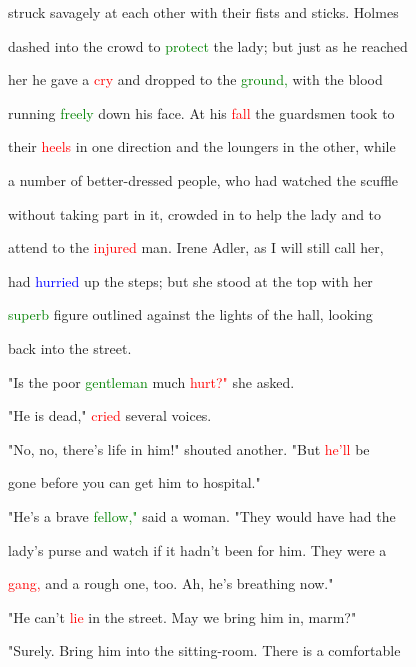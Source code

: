  struck savagely at each other with their fists and sticks. Holmes

 dashed into the crowd to \textcolor{green}{protect} the lady; but just as he reached

 her he gave a \textcolor{red}{cry} and dropped to the \textcolor{green}{ground,} with the blood

 running \textcolor{green}{freely} down his face. At his \textcolor{red}{fall} the guardsmen took to

 their \textcolor{red}{heels} in one direction and the loungers in the other, while

 a number of better-dressed people, who had \textcolor{BurntOrange}{watched} the scuffle

 without taking part in it, crowded in to help the lady and to

 attend to the \textcolor{red}{injured} man. Irene Adler, as I will still call her,

 had \textcolor{blue}{hurried} up the steps; but she stood at the \textcolor{BurntOrange}{top} with her

 \textcolor{green}{superb} figure outlined against the lights of the hall, looking

 back into the street.



 "Is the poor \textcolor{green}{gentleman} much \textcolor{red}{hurt?"} she asked.



 "He is dead," \textcolor{red}{cried} several voices.



 "No, no, there's life in him!" \textcolor{BurntOrange}{shouted} another. "But \textcolor{red}{he'll} be

 gone before you can get him to \textcolor{BurntOrange}{hospital."}



 "He's a brave \textcolor{green}{fellow,"} said a woman. "They would have had the

 lady's purse and \textcolor{BurntOrange}{watch} if it hadn't been for him. They were a

 \textcolor{red}{gang,} and a rough one, too. Ah, he's breathing now."



 "He can't \textcolor{red}{lie} in the street. May we bring him in, marm?"



 "Surely. Bring him into the sitting-room. There is a comfortable

